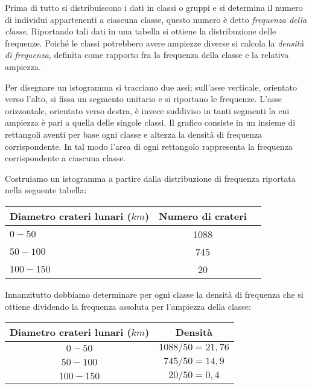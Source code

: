Prima di tutto si distribuiscono i dati in classi o gruppi e si determina 
il numero di individui appartenenti a ciascuna classe, questo numero è
detto \emph{frequenza della classe}.
Riportando tali dati in una tabella si ottiene la distribuzione delle 
frequenze. Poiché le classi potrebbero avere ampiezze diverse si calcola
la \emph{densità di frequenza}, definita come rapporto fra la frequenza 
della classe e la relativa ampiezza.

Per disegnare un istogramma si tracciano due assi; sull'asse verticale, 
orientato verso l'alto, si fissa un segmento unitario e si riportano
le frequenze. L'asse orizzontale, orientato verso destra, è invece 
suddiviso in tanti segmenti la cui ampiezza è pari a quella delle singole 
classi.
Il grafico consiste in un insieme di rettangoli aventi per base ogni classe 
e altezza la densità di frequenza corrispondente.
In tal modo l'area di ogni rettangolo rappresenta la frequenza 
corrispondente a ciascuna classe.

 \begin{esempio}

Costruiamo un istogramma a partire dalla distribuzione di frequenza 
riportata nella seguente tabella:
\begin{center}
\begin{tabular}{lcc}
\toprule
Diametro crateri lunari ($\unit{km}$) & Numero di crateri\\
\midrule
$0-50$ & 1088 \\
$50-100$ & 745 \\
$100-150$ & 20 \\
\bottomrule
\end{tabular}
\end{center}

Innanzitutto dobbiamo determinare per ogni classe la densità di frequenza 
che si ottiene dividendo la frequenza assoluta per l'ampiezza della classe:

\begin{center}
\begin{minipage}{.6\textwidth}
\begin{tabular}{cc}
\toprule
Diametro crateri lunari ($\unit{km}$) & Densità\\
\midrule
$0-50$ & $1088/50=21,76$ \\
$50-100$ & $745/50=14,9$ \\
$100-150$ & $20/50=0,4$ \\
\bottomrule
\end{tabular}
\end{minipage} 
\begin{minipage}{.38\textwidth}
\begin{inaccessibleblock}

\end{inaccessibleblock}
\end{minipage}
\end{center}

\end{esempio}

